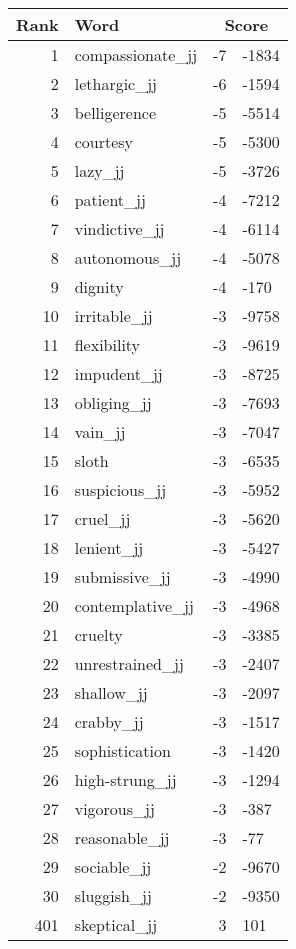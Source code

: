 \begin{longtable}[!htbp]{| rlr@{.}l |}
    \hline
    \textbf{Rank} & \textbf{Word} & \multicolumn{2}{c|}{\textbf{Score}} \\
    \hline
    \endhead
    1 & compassionate\_jj & -7 & -1834 \\
    2 & lethargic\_jj & -6 & -1594 \\
    3 & belligerence & -5 & -5514 \\
    4 & courtesy & -5 & -5300 \\
    5 & lazy\_jj & -5 & -3726 \\
    6 & patient\_jj & -4 & -7212 \\
    7 & vindictive\_jj & -4 & -6114 \\
    8 & autonomous\_jj & -4 & -5078 \\
    9 & dignity & -4 & -170 \\
    10 & irritable\_jj & -3 & -9758 \\
    11 & flexibility & -3 & -9619 \\
    12 & impudent\_jj & -3 & -8725 \\
    13 & obliging\_jj & -3 & -7693 \\
    14 & vain\_jj & -3 & -7047 \\
    15 & sloth & -3 & -6535 \\
    16 & suspicious\_jj & -3 & -5952 \\
    17 & cruel\_jj & -3 & -5620 \\
    18 & lenient\_jj & -3 & -5427 \\
    19 & submissive\_jj & -3 & -4990 \\
    20 & contemplative\_jj & -3 & -4968 \\
    21 & cruelty & -3 & -3385 \\
    22 & unrestrained\_jj & -3 & -2407 \\
    23 & shallow\_jj & -3 & -2097 \\
    24 & crabby\_jj & -3 & -1517 \\
    25 & sophistication & -3 & -1420 \\
    26 & high-strung\_jj & -3 & -1294 \\
    27 & vigorous\_jj & -3 & -387 \\
    28 & reasonable\_jj & -3 & -77 \\
    29 & sociable\_jj & -2 & -9670 \\
    30 & sluggish\_jj & -2 & -9350 \\
    401 & skeptical\_jj & 3 & 101 \\

\end{longtable}
